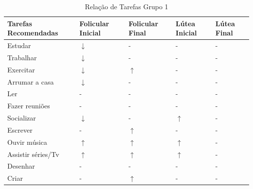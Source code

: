 \begin{table}[htbp]
    \centering
    \caption{Relação de Tarefas Grupo 1}
    \label{tab11}
    \begin{tabular}{p{5cm}p{1.8cm}p{1.8cm}p{1.8cm}p{1.8cm}}
    \toprule
    \textbf{Tarefas Recomendadas}  & \textbf{Folicular Inicial} & \textbf{Folicular Final}  & \textbf{Lútea Inicial}& \textbf{Lútea Final} \\ 
    \midrule
    Estudar & $\downarrow$  & - & - & - \\ 
    \midrule
    Trabalhar & $\downarrow$ & -  & -&  -  \\ 
    \midrule
    Exercitar & $\downarrow$ & $\uparrow$ & - &  -  \\ 
    \midrule
    Arrumar a casa  & $\downarrow$ & -  & - & - \\ 
    \midrule
    Ler & - & -  & - & - \\ 
    \midrule
    Fazer reuniões & - & - & - & - \\ 
    \midrule
    Socializar & $\downarrow$ & - & $\uparrow$ & - \\ 
    \midrule
    Escrever & - & $\uparrow$  & - & - \\
    \midrule 
    Ouvir música & $\uparrow$ & $\uparrow$ & $\uparrow$ & - \\ 
    \midrule
    Assistir séries/Tv & $\uparrow$ & $\uparrow$ & $\uparrow$ & - \\ 
    \midrule
    Desenhar & - & -  & - & - \\ 
    \midrule
    Criar & - & $\uparrow$  & - & - \\ 
    \bottomrule    
    \end{tabular}
    \end{table}

